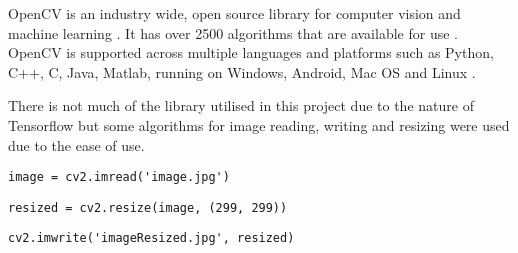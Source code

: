 OpenCV is an industry wide, open source library for computer vision and machine learning \textcite{opencv}.
It has over 2500 algorithms that are available for use \textcite{opencv}.
OpenCV is supported across multiple languages and platforms such as Python, C++, C, Java, Matlab, running on Windows, Android, Mac OS and Linux \textcite{opencv}.

There is not much of the library utilised in this project due to the nature of Tensorflow but some algorithms for image reading, writing and resizing were used due to the ease of use.

\begin{lstlisting}
image = cv2.imread('image.jpg')
\end{lstlisting}

\begin{lstlisting}
resized = cv2.resize(image, (299, 299))
\end{lstlisting}

\begin{lstlisting}
cv2.imwrite('imageResized.jpg', resized)
\end{lstlisting}

